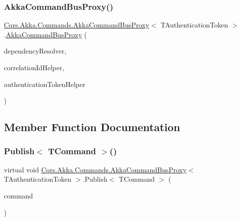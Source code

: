 \subsubsection{\texorpdfstring{Akka\+Command\+Bus\+Proxy()}{AkkaCommandBusProxy()}}
{\footnotesize\ttfamily \hyperlink{classCqrs_1_1Akka_1_1Commands_1_1AkkaCommandBusProxy}{Cqrs.\+Akka.\+Commands.\+Akka\+Command\+Bus\+Proxy}$<$ T\+Authentication\+Token $>$.\hyperlink{classCqrs_1_1Akka_1_1Commands_1_1AkkaCommandBusProxy}{Akka\+Command\+Bus\+Proxy} (\begin{DoxyParamCaption}\item[{\hyperlink{interfaceCqrs_1_1Configuration_1_1IDependencyResolver}{I\+Dependency\+Resolver}}]{dependency\+Resolver,  }\item[{I\+Correlation\+Id\+Helper}]{correlation\+Id\+Helper,  }\item[{\hyperlink{interfaceCqrs_1_1Authentication_1_1IAuthenticationTokenHelper}{I\+Authentication\+Token\+Helper}$<$ T\+Authentication\+Token $>$}]{authentication\+Token\+Helper }\end{DoxyParamCaption})}



\subsection{Member Function Documentation}
\mbox{\label{classCqrs_1_1Akka_1_1Commands_1_1AkkaCommandBusProxy_a410c0fe52016d04de950b1ae767d2ccb}} 
\subsubsection{\texorpdfstring{Publish$<$ T\+Command $>$()}{Publish< TCommand >()}\hspace{0.1cm}{\footnotesize\ttfamily [1/2]}}
{\footnotesize\ttfamily virtual void \hyperlink{classCqrs_1_1Akka_1_1Commands_1_1AkkaCommandBusProxy}{Cqrs.\+Akka.\+Commands.\+Akka\+Command\+Bus\+Proxy}$<$ T\+Authentication\+Token $>$.Publish$<$ T\+Command $>$ (\begin{DoxyParamCaption}\item[{T\+Command}]{command }\end{DoxyParamCaption})\hspace{0.3cm}{\ttfamily [virtual]}}



